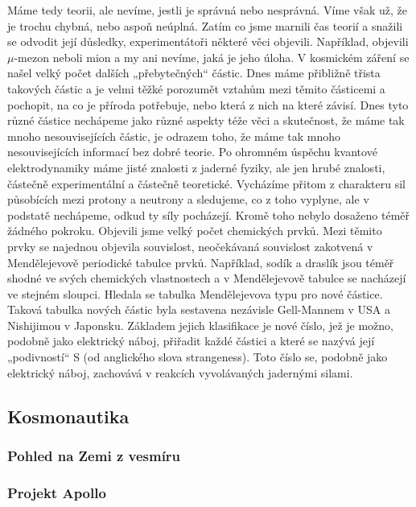       Máme tedy teorii, ale nevíme, jestli je správná nebo nesprávná. Víme však už, že je trochu
      chybná, nebo aspoň neúplná. Zatím co jsme marnili čas teorií a snažili se odvodit její
      důsledky, experimentátoři některé věci objevili. Například, objevili \(\mu\text{-mezon}\)
      neboli mion a my ani nevíme, jaká je jeho úloha. V kosmickém záření se našel velký počet
      dalších „přebytečných“ částic. Dnes máme přibližně třista takových částic a je velmi těžké
      porozumět vztahům mezi těmito částicemi a pochopit, na co je příroda potřebuje, nebo která z
      nich na které závisí. Dnes tyto různé částice nechápeme jako různé aspekty téže věci a
      skutečnost, že máme tak mnoho nesouvisejících částic, je odrazem toho, že máme tak mnoho
      nesouvisejících informací bez dobré teorie. Po ohromném úspěchu kvantové elektrodynamiky máme
      jisté znalosti z jaderné fyziky, ale jen hrubé znalosti, částečně experimentální a částečně
      teoretické. Vycházíme přitom z charakteru sil působících mezi protony a neutrony a sledujeme,
      co z toho vyplyne, ale v podstatě nechápeme, odkud ty síly pocházejí. Kromě toho nebylo
      dosaženo téměř žádného pokroku. Objevili jsme velký počet chemických prvků. Mezi těmito prvky
      se najednou objevila souvislost, neočekávaná souvislost zakotvená v Mendělejevově periodické
      tabulce prvků. Například, sodík a draslík jsou téměř shodné ve svých chemických vlastnostech a
      v Mendělejevově tabulce se nacházejí ve stejném sloupci. Hledala se tabulka Mendělejevova typu
      pro nové částice. Taková tabulka nových částic byla sestavena nezávisle Gell-Mannem v USA a
      Nishijimou v Japonsku. Základem jejich klasifikace je nové číslo, jež je možno, podobně jako
      elektrický náboj, přiřadit každé částici a které se nazývá její „podivností“ S (od anglického
      slova strangeness). Toto číslo se, podobně jako elektrický náboj, zachovává v reakcích
      vyvolávaných jadernými silami.  
    
    \subsection{Kosmonautika}
      \subsubsection{Pohled na Zemi z vesmíru}  
      \subsubsection{Projekt Apollo}  

